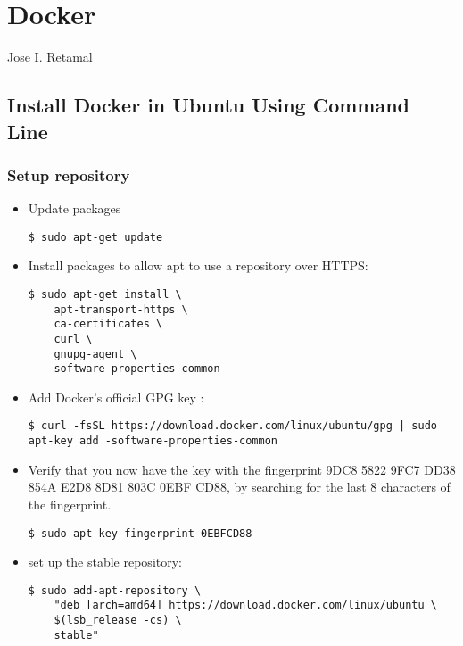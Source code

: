 \chapter{Docker}{Jose I. Retamal }

  
\section{Install Docker in Ubuntu Using Command Line}	
  	
  
\subsection{Setup repository}
\begin{itemize}
\item Update packages 
	
\begin{verbatim}
$ sudo apt-get update
\end{verbatim}

\item Install packages to allow apt to use a repository over HTTPS:

\begin{verbatim}
$ sudo apt-get install \
	apt-transport-https \
	ca-certificates \
	curl \
	gnupg-agent \
	software-properties-common
\end{verbatim}

\item Add Docker’s official GPG key :
\begin{verbatim}
$ curl -fsSL https://download.docker.com/linux/ubuntu/gpg | sudo apt-key add -software-properties-common
\end{verbatim}


\item Verify that you now have the key with the fingerprint 9DC8 5822 9FC7 DD38 854A E2D8 8D81 803C 0EBF CD88, by searching for the last 8 characters of the fingerprint.
\begin{verbatim}
$ sudo apt-key fingerprint 0EBFCD88
\end{verbatim}


\item set up the stable repository:
\begin{verbatim}
$ sudo add-apt-repository \
	"deb [arch=amd64] https://download.docker.com/linux/ubuntu \
	$(lsb_release -cs) \
	stable"
\end{verbatim}

\end{itemize}

